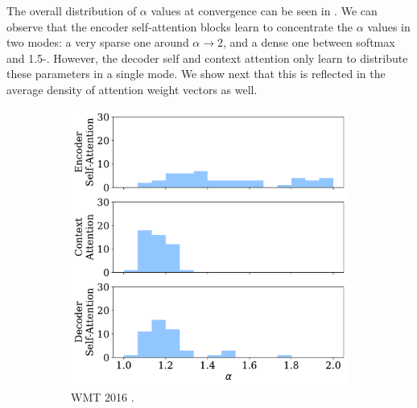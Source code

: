 The overall distribution of $\alpha$ values at convergence can be
seen in . We can observe that the encoder
self-attention blocks learn to concentrate the $\alpha$ values in two
modes: a very sparse one around $\alpha \rightarrow 2$, and a dense
one between softmax and 1.5-\entmaxtext{}. However, the decoder self
and context attention only learn to distribute these parameters in a
single mode. We show next that this is reflected in the average
density of attention weight vectors as well.

\begin{figure}[!htbp]
    \centering
    \begin{subfigure}[b]{.49\linewidth}
        \includegraphics[width=\linewidth]{Figures/hist_alphas_ro.pdf}
        \caption{%
            \label{fig:hist_alphas_ro}%
            WMT 2016 .}
    \end{subfigure}
    \begin{subfigure}[b]{.49\linewidth}

\end{subfigure}
\end{figure}
